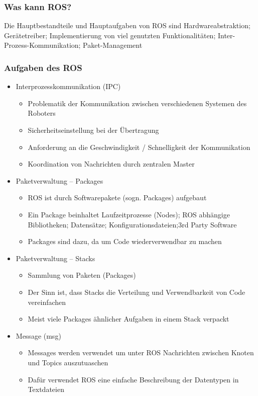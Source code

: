 \subsubsection{Was kann ROS?}
Die Hauptbestandteile und Hauptaufgaben von ROS sind Hardwareabstraktion; Gerätetreiber; Implementierung 
von viel genutzten Funktionalitäten; Inter-Prozess-Kommunikation; Paket-Management
\subsubsection{Aufgaben des ROS}
\begin{itemize}
 \item Interprozesskommunikation (IPC)
 \begin{itemize}
\item Problematik der Kommunikation zwischen verschiedenen Systemen des Roboters
\item Sicherheitseinstellung bei der Übertragung
\item Anforderung an die Geschwindigkeit / Schnelligkeit der Kommunikation
\item Koordination von Nachrichten durch zentralen Master
\end{itemize}
\item Paketverwaltung – Packages
\begin{itemize}
 \item ROS ist durch Softwarepakete (sogn. Packages) aufgebaut
 \item Ein Package beinhaltet Laufzeitprozesse (Nodes); ROS abhängige Bibliotheken;
Datensätze; Konfigurationsdateien;3rd Party Software
 \item Packages sind dazu, da um Code wiederverwendbar zu machen
\end{itemize}
\item Paketverwaltung – Stacks
\begin{itemize}
\item Sammlung von Paketen (Packages)
\item Der Sinn ist, dass Stacks die Verteilung und Verwendbarkeit von Code
vereinfachen
\item Meist viele Packages ähnlicher Aufgaben in einem Stack verpackt
\end{itemize}
\item Message (msg)
\begin{itemize}
 \item  Messages werden verwendet um unter ROS Nachrichten zwischen Knoten und
Topics auszutuaschen
\item Dafür verwendet ROS eine einfache Beschreibung der Datentypen in Textdateien

\end{itemize}
\end{itemize}
